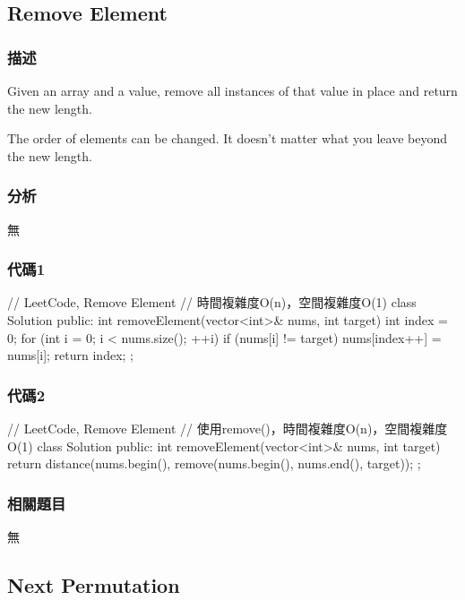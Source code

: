 \subsection{Remove Element} %
\label{sec:remove-element }


\subsubsection{描述}
Given an array and a value, remove all instances of that value in place and return the new length.

The order of elements can be changed. It doesn't matter what you leave beyond the new length.


\subsubsection{分析}
無


\subsubsection{代碼1}
\begin{Code}
// LeetCode, Remove Element
// 時間複雜度O(n)，空間複雜度O(1)
class Solution {
public:
    int removeElement(vector<int>& nums, int target) {
        int index = 0;
        for (int i = 0; i < nums.size(); ++i) {
            if (nums[i] != target) {
                nums[index++] = nums[i];
            }
        }
        return index;
    }
};
\end{Code}


\subsubsection{代碼2}
\begin{Code}
// LeetCode, Remove Element
// 使用remove()，時間複雜度O(n)，空間複雜度O(1)
class Solution {
public:
    int removeElement(vector<int>& nums, int target) {
        return distance(nums.begin(), remove(nums.begin(), nums.end(), target));
    }
};
\end{Code}


\subsubsection{相關題目}
\begindot
\item 無
\myenddot


\subsection{Next Permutation} %
\label{sec:next-permutation}


